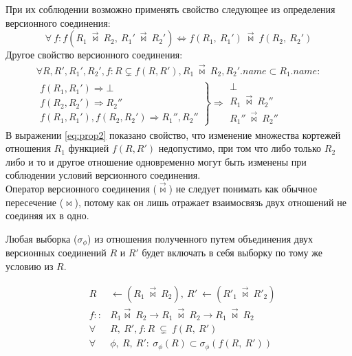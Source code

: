 \indent При их соблюдении возможно применять свойство следующее из определения версионного соединения:
\begin{equation}
	\forall\ f : f(R_1\ \overrightarrow{\bowtie}\ R_2,\ R_1'\ \overrightarrow{\bowtie}\ R_2') \Leftrightarrow
	f(R_1,\ R_1')\ \overrightarrow{\bowtie}\ f(R_2,\ R_2')
\end{equation}
\indent Другое свойство версионного соединения: 
\begin{multline}
	\label{eq:prop2}
	\forall R, R', R_1', R_2', f : R \varsubsetneq f(R, R'), R_1\ \overrightarrow{\bowtie}\ R_2, R_2'.name \subset R_1.name :\\
	\left.
	\begin{array}{ccc}
		f(R_1, R_1') \Rightarrow \bot \\
		f(R_2, R_2') \Rightarrow R_2'' \\
		f(R_1, R_1'), f(R_2, R_2') \Rightarrow R_1'', R_2''
	\end{array} 
	\right\} \Rightarrow
	\left.
	\begin{array}{ccc}
		\bot \\
		R_1\ \overrightarrow{\bowtie}\ R_2''\\
		R_1''\ \overrightarrow{\bowtie}\ R_2''
	\end{array}
	\right.
\end{multline}
\indent В выражении \ref{eq:prop2} показано свойство, что изменение множества кортежей отношения $R_1$ функцией $f(R, R')$ недопустимо, при том что либо только $R_2$ либо и то и другое отношение одновременно могут быть изменены при соблюдении условий версионного соединения.\\
\indent Оператор версионного соединения ($\overrightarrow{\bowtie}$) не следует понимать как обычное пересечение ($\bowtie$), потому как он лишь отражает взаимосвязь двух отношений не соединяя их в одно.

\begin{theorem}
	Любая выборка ($\sigma_\phi$) из отношения полученного путем объединения двух версионных соединений $R$ и $R'$ будет включать в себя выборку по тому же условию из $R$.
\end{theorem}
\begin{eqnarray}
	&R\ & \leftarrow (R_1\ \overrightarrow{\bowtie}\ R_2),\ 
	R'\ \leftarrow (R'_1\ \overrightarrow{\bowtie}\ R'_2)\\
	&f:: & R_1 \overrightarrow{\bowtie}\ R_2 \rightarrow R_1\ \overrightarrow{\bowtie}\ R_2 \rightarrow R_1\ \overrightarrow{\bowtie}\ R_2 \\
	&\forall\ & R,\ R', f : R\ \subsetneq\ f (R,\ R') \\
	&\forall\ & \phi,\ R,\ R' :\ \sigma_\phi(R) \subset \sigma_\phi(f(R,\ R'))
	\label{eq:th}
\end{eqnarray}


